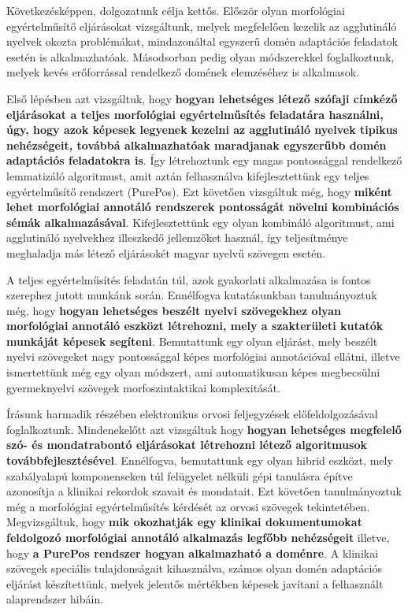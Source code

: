 Következésképpen, dolgozatunk célja kettős.
Először olyan morfológiai egyértelműsítő eljárásokat vizsgáltunk, melyek megfelelően kezelik az agglutináló nyelvek okozta problémákat, mindazonáltal egyszerű domén adaptációs feladatok esetén is alkalmazhatóak.
Másodsorban pedig olyan módszerekkel foglalkoztunk, melyek kevés erőforrással rendelkező domének elemzéséhez is alkalmasok.

Első lépésben azt vizsgáltuk, hogy \textbf{hogyan lehetséges létező szófaji címkéző eljárásokat a teljes morfológiai egyértelműsítés feladatára használni, úgy, hogy azok képesek legyenek kezelni az agglutináló nyelvek tipikus nehézségeit, továbbá alkalmazhatóak maradjanak egyszerűbb domén adaptációs feladatokra is}.
Így létrehoztunk egy magas pontossággal rendelkező lemmatizáló algoritmust, amit aztán felhasználva kifejlesztettünk egy teljes egyértelműsítő rendszert (PurePos).
Ezt követően vizsgáltuk még, hogy \textbf{miként lehet morfológiai annotáló rendszerek pontosságát növelni kombinációs sémák alkalmazásával}.
Kifejlesztettünk egy olyan kombináló algoritmust, ami agglutináló nyelvekhez illeszkedő jellemzőket használ, így teljesítménye meghaladja más létező eljárásokét magyar nyelvű szövegen esetén.

A teljes egyértelműsítés feladatán túl, azok gyakorlati alkalmazása is fontos szerephez jutott munkánk során.
Ennélfogva kutatásunkban tanulmányoztuk még, hogy \textbf{hogyan lehetséges beszélt nyelvi szövegekhez olyan morfológiai annotáló eszközt létrehozni, mely a szakterületi kutatók munkáját képesek segíteni}.
Bemutattunk egy olyan eljárást, mely beszélt nyelvi szövegeket nagy pontossággal képes morfológiai annotációval ellátni, illetve ismertettünk még egy olyan módszert, ami automatikusan képes megbecsülni gyermeknyelvi szövegek morfoszintaktikai komplexitását.

Írásunk harmadik részében elektronikus orvosi feljegyzések előfeldolgozásával foglalkoztunk.
Mindenekelőtt azt vizsgáltuk hogy \textbf{hogyan lehetséges megfelelő szó- és mondatrabontó eljárásokat létrehozni létező algoritmusok továbbfejlesztésével}.
Ennélfogva, bemutattunk egy olyan hibrid eszközt, mely szabályalapú komponenseken túl felügyelet nélküli gépi tanulásra építve azonosítja a klinikai rekordok szavait és mondatait. 
Ezt követően tanulmányoztuk még a morfológiai egyértelműsítés kérdését az orvosi szövegek tekintetében.
Megvizsgáltuk, hogy \textbf{mik okozhatják egy klinikai dokumentumokat feldolgozó morfológiai annotáló alkalmazás legfőbb nehézségeit} illetve, hogy \textbf{a PurePos rendszer hogyan alkalmazható a doménre}.
A klinikai szövegek speciális tulajdonságait kihasználva, számos olyan domén adaptációs eljárást készítettünk, melyek jelentős mértékben képesek javítani a felhasznált alaprendszer hibáin.



